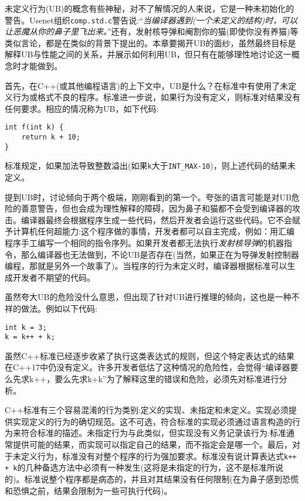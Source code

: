 未定义行为(UB)的概念有些神秘，对不了解情况的人来说，它是一种未初始化的警告。Usenet组织\texttt{comp.std.c}警告说:“\textit{当编译器遇到(一个未定义的结构)时，可以让恶魔从你的鼻子里飞出来。}”还有，发射核导弹和阉割你的猫(即使你没有养猫)等类似言论，都是在类似的背景下提出的。本章要揭开UB的面纱，虽然最终目标是解释UB与性能之间的关系，并展示如何利用UB，但只有在能够理性地讨论这一概念时才能做到。

首先，在C++(或其他编程语言)的上下文中，UB是什么？在标准中有使用了未定义行为或格式不良的程序。标准进一步说，如果行为没有定义，则标准对结果没有任何要求。相应的情况称为UB，如下代码:

\begin{lstlisting}[style=styleCXX]
int f(int k) {
	return k + 10;
}
\end{lstlisting}

标准规定，如果加法导致整数溢出(如果\texttt{k}大于\texttt{INT\_MAX-10})，则上述代码的结果未定义。

提到UB时，讨论倾向于两个极端，刚刚看到的第一个。夸张的语言可能是对UB危险的善意警告，但也会成为理性解释的障碍，因为鼻子和猫都不会受到编译器的攻击。编译器最终会根据程序生成一些代码，然后开发者会运行这些代码。它不会赋予计算机任何超能力:这个程序做的事情，开发者都可以自主完成，例如：用汇编程序手工编写一个相同的指令序列。如果开发者都无法执行\textit{发射核导弹}的机器指令，那么编译器也无法做到，不论UB是否存在(当然，如果正在为导弹发射控制器编程，那就是另外一个故事了)。当程序的行为未定义时，编译器根据标准可以生成开发者不期望的代码。

虽然夸大UB的危险没什么意思，但出现了针对UB进行推理的倾向，这也是一种不祥的做法。例如以下代码:

\begin{lstlisting}[style=styleCXX]
int k = 3;
k = k++ + k;
\end{lstlisting}

虽然C++标准已经逐步收紧了执行这类表达式的规则，但这个特定表达式的结果在C++17中仍没有定义。许多开发者低估了这种情况的危险性，会觉得“编译器要么先求k++，要么先求k+k”为了解释这里的错误和危险，必须先对标准进行分析。

C++标准有三个容易混淆的行为类别:定义的实现、未指定和未定义。实现必须提供实现定义的行为的确切规范。这不可选，符合标准的实现必须通过语言构造的行为来符合标准的描述。未指定行为与此类似，但实现没有义务记录该行为:标准通常提供可能的结果，而实现可以指定自己的结果，而不指定会是哪一个。最后，对于未定义行为，标准没有对整个程序的行为强加要求。标准没有说计算表达式\texttt{k++ + k}的几种备选方法中必须有一种发生(这将是未指定的行为，这不是标准所说的)。标准说整个程序都是病态的，并且对其结果没有任何限制(在为鼻子感到恐慌和恐惧之前，结果会限制为一些可执行代码)。

